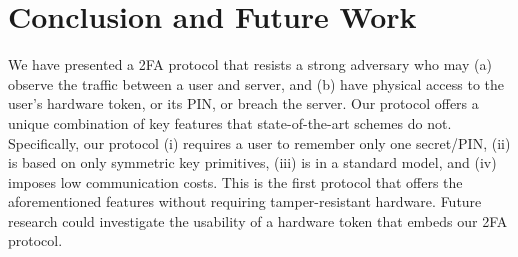 

\section{Conclusion and Future Work}

We have presented a 2FA protocol that resists a strong adversary who may (a) observe the traffic between a user and server, and (b) have physical access to the user’s hardware token, or its PIN, or breach the server. Our protocol offers a unique combination of key features that state-of-the-art schemes do not. Specifically,  our protocol (i) requires a user to remember only one secret/PIN, (ii) is based on only symmetric key primitives, (iii) is in a standard model, and (iv) imposes low communication costs. This is the first protocol that offers the aforementioned features without requiring tamper-resistant hardware. Future research could investigate the usability of a hardware token that embeds our 2FA protocol. 

